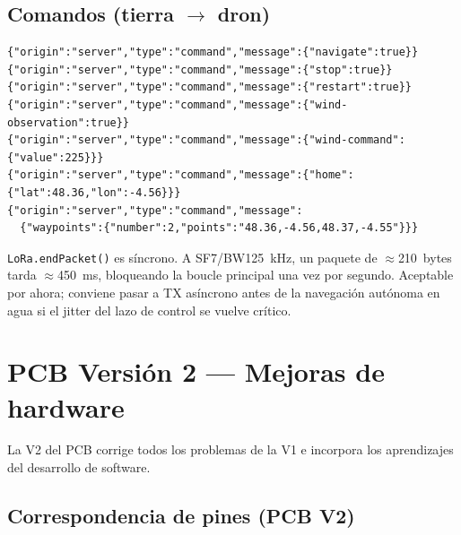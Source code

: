 \documentclass[12pt,a4paper]{article}
\begin{document}
\subsection{Comandos (tierra $\to$ dron)}

\begin{lstlisting}[style=json, caption={Comandos soportados}]
{"origin":"server","type":"command","message":{"navigate":true}}
{"origin":"server","type":"command","message":{"stop":true}}
{"origin":"server","type":"command","message":{"restart":true}}
{"origin":"server","type":"command","message":{"wind-observation":true}}
{"origin":"server","type":"command","message":{"wind-command":{"value":225}}}
{"origin":"server","type":"command","message":{"home":{"lat":48.36,"lon":-4.56}}}
{"origin":"server","type":"command","message":
  {"waypoints":{"number":2,"points":"48.36,-4.56,48.37,-4.55"}}}
\end{lstlisting}

\begin{infobox}
  \texttt{LoRa.endPacket()} es s\'incrono. A SF7/BW125~kHz, un paquete de
  $\approx$210~bytes tarda $\approx$450~ms, bloqueando la boucle principal una vez
  por segundo. Aceptable por ahora; conviene pasar a TX as\'incrono antes de la
  navegaci\'on aut\'onoma en agua si el jitter del lazo de control se vuelve
  cr\'itico.
\end{infobox}

\section{PCB Versi\'on 2 --- Mejoras de hardware}

La V2 del PCB corrige todos los problemas de la V1 e incorpora los aprendizajes
del desarrollo de software.

\subsection{Correspondencia de pines (PCB V2)}
\end{document}
